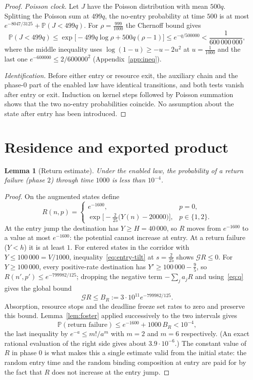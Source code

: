 \documentclass[11pt,a4paper]{article}
\theoremstyle{plain}
\newtheorem{lemma}[theorem]{Lemma}
\theoremstyle{definition}
\theoremstyle{remark}
\newcommand{\Prob}{\mathbb P}
\newcommand{\G}{\mathcal G}
\begin{document}
\begin{proof}
\emph{Poisson clock.} Let $J$ have the Poisson distribution with mean $500q$. Splitting the Poisson sum at $499q$, the no-entry probability at time $500$ is at most $e^{-8047/3125}+\Prob(J<499q)$. For $\rho=\frac{999}{1000}$ the Chernoff bound gives
\[
\Prob(J<499q)\le\exp\bigl[-499q\log\rho+500q(\rho-1)\bigr]\le e^{-q/500000}<\frac1{600\,000\,000},
\]
where the middle inequality uses $\log(1-u)\ge-u-2u^2$ at $u=\frac1{1000}$ and the last one $e^{-600000}\le2/600000^2$ (Appendix~\ref{app:ineq}).

\emph{Identification.} Before either entry or resource exit, the auxiliary chain and the phase-$0$ part of the enabled law have identical transitions, and both tests vanish after entry or exit. Induction on kernel steps followed by Poisson summation shows that the two no-entry probabilities coincide. No assumption about the state after entry has been introduced.
\end{proof}

\section{Residence and exported product}\label{sec:residence}

\begin{lemma}[Return estimate]\label{lem:return}
Under the enabled law, the probability of a return failure (phase $2$) through time $1000$ is less than $10^{-4}$.
\end{lemma}
\begin{proof}
On the augmented states define
\[
R(n,p)=\begin{cases}e^{-1600},&p=0,\\[2pt] \exp\bigl[-\tfrac2{25}\bigl(Y(n)-20000\bigr)\bigr],&p\in\{1,2\}.\end{cases}
\]
At the entry jump the destination has $Y\ge H=40\,000$, so $R$ moves from $e^{-1600}$ to a value at most $e^{-1600}$: the potential cannot increase at entry. At a return failure ($Y<h$) it is at least $1$. For entered states in the corridor with $Y\le100\,000=V/1000$, inequality~\eqref{eq:entry-tilt} at $s=\frac2{25}$ shows $\G R\le0$. For $Y\ge100\,000$, every positive-rate destination has $Y'\ge100\,000-\frac95$, so $R(n',p')\le e^{-799982/125}$; dropping the negative term $-\sum_ja_jR$ and using~\eqref{eq:q} gives the global bound
\[
\G R\le B_R:=3\cdot10^{11}e^{-799982/125}.
\]
Absorption, resource stops and the deadline freeze set rates to zero and preserve this bound. Lemma~\ref{lem:foster} applied successively to the two intervals gives
\begin{equation}\label{eq:return}
\Prob(\text{return failure})\le e^{-1600}+1000\,B_R<10^{-4},
\end{equation}
the last inequality by $e^{-a}\le m!/a^m$ with $m=2$ and $m=6$ respectively. (An exact rational evaluation of the right side gives about $3.9\cdot10^{-6}$.) The constant value of $R$ in phase $0$ is what makes this a single estimate valid from the initial state: the random entry time and the random binding composition at entry are paid for by the fact that $R$ does not increase at the entry jump.
\end{proof}
\end{document}
